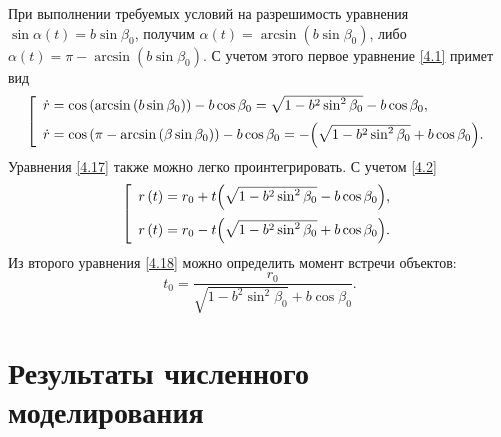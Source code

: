 \documentclass[a4paper,12pt, openany]{book}
\theoremstyle{plain} %
\theoremstyle{definition} %
\theoremstyle{remark} %
\numberwithin{equation}{chapter}
\begin{document}
{При выполнении требуемых условий на разрешимость уравнения $\sin\alpha(t) = b\sin\beta_0$, получим $
\alpha \left( t \right) = \arcsin \left( {b\sin \beta _0 } \right)$, либо $
\alpha \left( t \right) = \pi  - \arcsin \left( {b\sin \beta _0 } \right)
$. С учетом этого первое уравнение \eqref{4.1} примет вид
\begin{equation}\label{4.17}
\left[
\begin{array}{*{20}l}
  \dot r = \cos \left( {\arcsin \left( {b\sin \beta _0 } \right)} \right) - b\cos \beta _0  = \sqrt {1 - b^2 \sin ^2 \beta _0 }  - b\cos \beta _0 , \hfill \vspace{0.2cm} \\
  \dot r = \cos \left( {\pi  - \arcsin \left( {\beta \sin \beta _0 } \right)} \right) - b\cos \beta _0  =  - \Big( {\sqrt {1 - b^2 \sin ^2 \beta _0 }  + b\cos \beta _0 } \Big). 
\end{array}
\right.
\end{equation}
Уравнения \eqref{4.17} также можно легко проинтегрировать. С учетом \eqref{4.2}
\begin{equation}\label{4.18}
\left[
\begin{array}{*{20}l}
  r\left( t \right) = r_0  + t\Big( {\sqrt {1 - b^2 \sin ^2 \beta _0 }  - b\cos \beta _0 } \Big), \hfill \vspace{0.2cm} \\
  r\left( t \right) = r_0  - t\Big( {\sqrt {1 - b^2 \sin ^2 \beta _0 }  + b\cos \beta _0 } \Big). 
\end{array}
\right.
\end{equation}
Из второго уравнения \eqref{4.18} можно определить момент встречи объектов:
\[
t_0  = \frac{{r_0 }}
{{\sqrt {1 - b^2 \sin ^2 \beta _0 }  + b\cos \beta _0 }}.
\]




\newpage

\section{Результаты численного моделирования}

}
\end{document}
